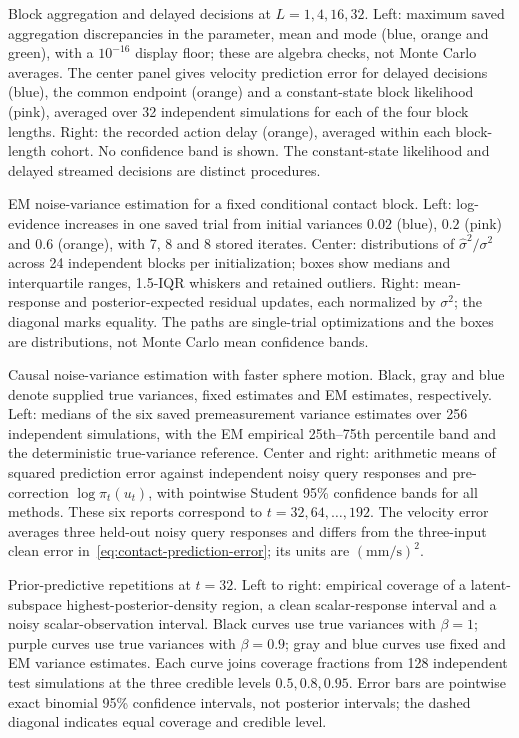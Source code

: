 \caption{Block aggregation and delayed decisions at $L=1,4,16,32$. Left: maximum saved aggregation discrepancies in the parameter, mean and mode (blue, orange and green), with a $10^{-16}$ display floor; these are algebra checks, not Monte Carlo averages. The center panel gives velocity prediction error for delayed decisions (blue), the common endpoint (orange) and a constant-state block likelihood (pink), averaged over 32 independent simulations for each of the four block lengths. Right: the recorded action delay (orange), averaged within each block-length cohort. No confidence band is shown. The constant-state likelihood and delayed streamed decisions are distinct procedures.}

\caption{EM noise-variance estimation for a fixed conditional contact block. Left: log-evidence increases in one saved trial from initial variances $0.02$ (blue), $0.2$ (pink) and $0.6$ (orange), with 7, 8 and 8 stored iterates. Center: distributions of $\widehat\sigma^2/\sigma^2$ across 24 independent blocks per initialization; boxes show medians and interquartile ranges, 1.5-IQR whiskers and retained outliers. Right: mean-response and posterior-expected residual updates, each normalized by $\sigma^2$; the diagonal marks equality. The paths are single-trial optimizations and the boxes are distributions, not Monte Carlo mean confidence bands.}

\caption{Causal noise-variance estimation with faster sphere motion. Black, gray and blue denote supplied true variances, fixed estimates and EM estimates, respectively. Left: medians of the six saved premeasurement variance estimates over 256 independent simulations, with the EM empirical 25th--75th percentile band and the deterministic true-variance reference. Center and right: arithmetic means of squared prediction error against independent noisy query responses and pre-correction $\log\pi_t(u_t)$, with pointwise Student 95\% confidence bands for all methods. These six reports correspond to $t=32,64,\ldots,192$. The velocity error averages three held-out noisy query responses and differs from the three-input clean error in~\eqref{eq:contact-prediction-error}; its units are $(\mathrm{mm}/\mathrm{s})^2$.}

\caption{Prior-predictive repetitions at $t=32$. Left to right: empirical coverage of a latent-subspace highest-posterior-density region, a clean scalar-response interval and a noisy scalar-observation interval. Black curves use true variances with $\beta=1$; purple curves use true variances with $\beta=0.9$; gray and blue curves use fixed and EM variance estimates. Each curve joins coverage fractions from 128 independent test simulations at the three credible levels $0.5,0.8,0.95$. Error bars are pointwise exact binomial 95\% confidence intervals, not posterior intervals; the dashed diagonal indicates equal coverage and credible level.}

